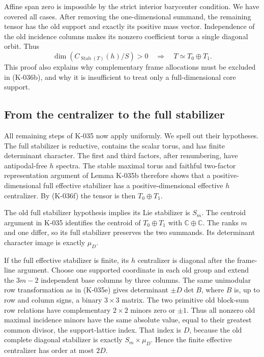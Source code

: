 Affine span zero is impossible by the strict interior
barycenter condition.  We have covered all cases.  After
removing the one-dimensional summand, the remaining tensor
has the old support and exactly its positive mass vector.
Independence of the old incidence columns makes its nonzero
coefficient torus a single diagonal orbit.  Thus
\[
  \dim(C_{\operatorname{Stab}(T)}(h)/S)>0
           \quad\Longrightarrow\quad T\simeq T_0\oplus T_1.
                                                               \tag{K-036f}
\]
This proof also explains why complementary frame allocations
must be excluded in (K-036b), and why it is insufficient to
treat only a full-dimensional core support.

\subsection*{From the centralizer to the full stabilizer}

All remaining steps of K-035 now apply uniformly.  We spell out
their hypotheses.  The full stabilizer is reductive, contains
the scalar torus, and has finite determinant character.  The
first and third factors, after renumbering, have antipodal-free
$h$ spectra.  The stable maximal torus and faithful two-factor
representation argument of Lemma K-035b therefore shows that
a positive-dimensional full effective stabilizer has a
positive-dimensional effective $h$ centralizer.  By (K-036f)
the tensor is then $T_0\oplus T_1$.

The old full stabilizer hypothesis implies its Lie stabilizer
is $S_m$.  The centroid argument in K-035 identifies the
centroid of $T_0\oplus T_1$ with $\mathbb C\oplus\mathbb C$.
The ranks $m$ and one differ, so its full stabilizer preserves
the two summands.  Its determinant character image is exactly
$\mu_D$.

If the full effective stabilizer is finite, its $h$ centralizer
is diagonal after the frame-line argument.  Choose one
supported coordinate in each old group and extend the
$3m-2$ independent base columns by three columns.  The same
unimodular row transformation as in (K-035e) gives determinant
$\pm D\det B$, where $B$ is, up to row and column signs,
a binary $3\times3$ matrix.  The two primitive old block-sum row
relations have complementary $2\times2$ minors zero or $\pm1$.
Thus all nonzero old maximal incidence minors have the same
absolute value, equal to their greatest common divisor, the
support-lattice index.  That index is $D$, because the old
complete diagonal stabilizer is exactly $S_m\times\mu_D$.
Hence the finite
effective centralizer has order at most $2D$.


